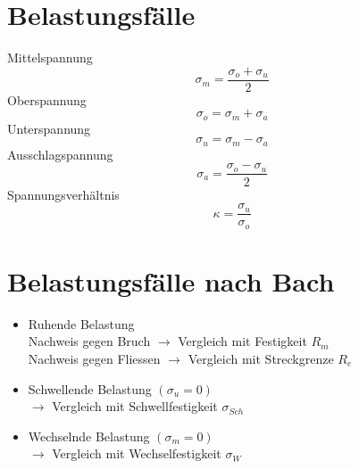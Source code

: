 



\section{Belastungsfälle}
Mittelspannung
\[ \sigma_m = \frac{\sigma_o + \sigma_u}{2} \]
Oberspannung
\[ \sigma_o = \sigma_m + \sigma_a \]
Unterspannung
\[ \sigma_u = \sigma_m - \sigma_a \]
Ausschlagspannung
\[ \sigma_a = \frac{\sigma_o - \sigma_u}{2} \]
Spannungsverhältnis
\[ \kappa = \frac{\sigma_u}{\sigma_o} \]

\section{Belastungsfälle nach Bach}
\begin{itemize}
  \item Ruhende Belastung\\
  Nachweis gegen Bruch $\rightarrow$ Vergleich mit Festigkeit $R_m$\\
  Nachweis gegen Fliessen $\rightarrow$ Vergleich mit Streckgrenze $R_e$
  \item Schwellende Belastung $(\sigma_u = 0)$\\
  $\rightarrow$ Vergleich mit Schwellfestigkeit $\sigma_{Sch}$
  \item Wechselnde Belastung $(\sigma_m = 0)$\\
  $\rightarrow$ Vergleich mit Wechselfestigkeit $\sigma_W$
\end{itemize}
